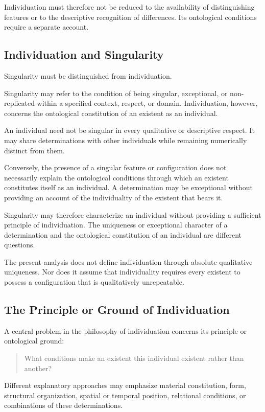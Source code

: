 Individuation must therefore not be reduced to the availability
of distinguishing features or to the descriptive recognition
of differences. Its ontological conditions require a separate
account.

\subsection{Individuation and Singularity}

Singularity must be distinguished from individuation.

Singularity may refer to the condition of being singular,
exceptional, or non-replicated within a specified context,
respect, or domain. Individuation, however, concerns the
ontological constitution of an existent as an individual.

An individual need not be singular in every qualitative or
descriptive respect. It may share determinations with other
individuals while remaining numerically distinct from them.

Conversely, the presence of a singular feature or configuration
does not necessarily explain the ontological conditions through
which an existent constitutes itself as an individual. A
determination may be exceptional without providing an account
of the individuality of the existent that bears it.

Singularity may therefore characterize an individual without
providing a sufficient principle of individuation. The uniqueness
or exceptional character of a determination and the ontological
constitution of an individual are different questions.

The present analysis does not define individuation through
absolute qualitative uniqueness. Nor does it assume that
individuality requires every existent to possess a configuration
that is qualitatively unrepeatable.

\subsection{The Principle or Ground of Individuation}

A central problem in the philosophy of individuation concerns
its principle or ontological ground:

\begin{quote}
What conditions make an existent this individual existent
rather than another?
\end{quote}

Different explanatory approaches may emphasize material
constitution, form, structural organization, spatial or temporal
position, relational conditions, or combinations of these
determinations.

